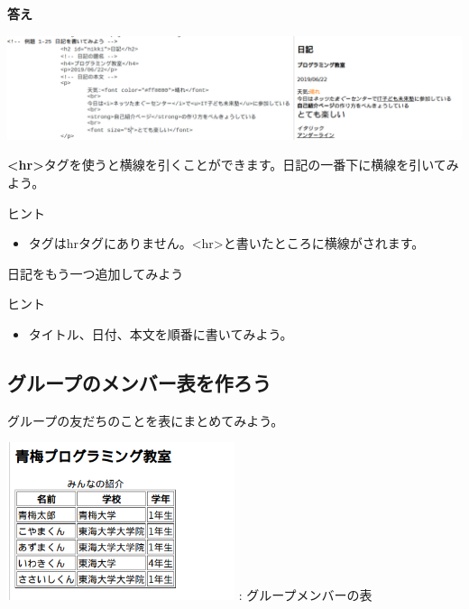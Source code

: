 \documentclass[a4paper,12pt]{jarticle}
\begin{document}
\clearpage
\textbf{答え}



\includegraphics[width=\textwidth]{textbook-img188.png}

\theQuestion\label{Q:hasAnswer04-8}
\textbf{{\textless}hr{\textgreater}}タグを使うと横線を引くことができます。日記の一番下に横線を引いてみよう。

ヒント

\begin{itemize}
  \item
        タグはhrタグにありません。{\textless}hr{\textgreater}と書いたところに横線がされます。
\end{itemize}
\theQuestion\label{Q:hasAnswer04-9}

日記をもう一つ追加してみよう

ヒント

\begin{itemize}
  \item
        タイトル、日付、本文を順番に書いてみよう。
\end{itemize}
\clearpage
{}
\subsection{\theExercise グループのメンバー表を作ろう}
\addtocounter{Exercise}{-1}\label{E:HTML_7}
グループの友だちのことを表にまとめてみよう。

\centering
\begin{minipage}{\textwidth}
  {\upshape
    \includegraphics[width=0.5\textwidth]{textbook-img189.png}
    \newline
    : グループメンバーの表}
\end{minipage}
\end{document}
